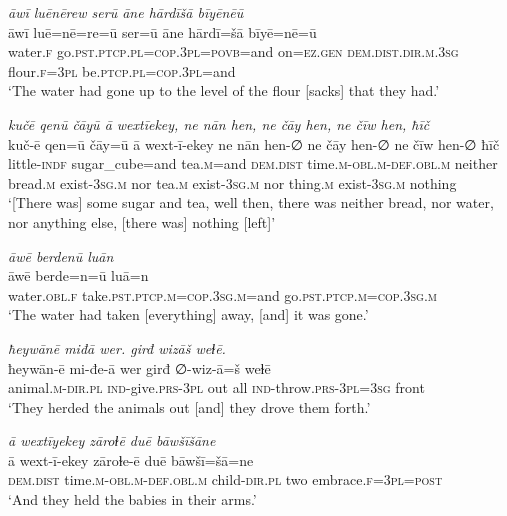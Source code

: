 \ea \label{ZB.28}
\textit{āwī luēnērew serū āne hārdīšā bīyēnēū} \\ 
\gll āwī luē=nē=re=ū ser=ū āne hārdī=šā bīyē=nē=ū \\ 
 water\textsc{.f} go\textsc{.pst}\textsc{.ptcp}\textsc{.pl}\textsc{=cop}\textsc{.3pl}\textsc{=\textsc{povb}}=and on\textsc{\textsc{=ez.gen}} \textsc{dem.dist}\textsc{.dir}\textsc{.m}\textsc{.3sg} flour\textsc{.f}\textsc{=3pl} be\textsc{.ptcp}\textsc{.pl}\textsc{=cop}\textsc{.3pl}=and \\ 
\glt `The water had gone up to the level of the flour [sacks] that they had.'
\z 
 
\ea \label{ZB.29}
\textit{kučē qenū čāyū ā wextīekey, ne nān hen, ne čāy hen, ne čīw hen, ħīč} \\ 
\gll kuč-ē qen=ū čāy=ū ā wext-ī-ekey ne nān hen-∅ ne čāy hen-∅ ne čīw hen-∅ ħīč \\ 
 little\textsc{-indf} sugar\_cube=and tea\textsc{.m}=and \textsc{dem.dist} time\textsc{.m}\textsc{-obl}\textsc{.m}\textsc{-def}\textsc{.obl}\textsc{.m} neither bread\textsc{.m} exist\textsc{-3sg}\textsc{.m} nor tea\textsc{.m} exist\textsc{-3sg}\textsc{.m} nor thing\textsc{.m} exist\textsc{-3sg}\textsc{.m} nothing \\ 
\glt `[There was] some sugar and tea, well then, there was neither bread, nor water, nor anything else, [there was] nothing [left]'
\z 
 
\ea \label{ZB.30}
\textit{āwē berdenū luān} \\ 
\gll āwē berde=n=ū luā=n \\ 
 water\textsc{.obl}\textsc{.f} take\textsc{.pst}\textsc{.ptcp}\textsc{.m}\textsc{=cop}\textsc{.3sg}\textsc{.m}=and go\textsc{.pst}\textsc{.ptcp}\textsc{.m}\textsc{=cop}\textsc{.3sg}\textsc{.m} \\ 
\glt `The water had taken [everything] away, [and] it was gone.'
\z 
 
\ea \label{ZB.31}
\textit{ħeywānē miđā wer. girđ wizāš weɫē.} \\ 
\gll ħeywān-ē mi-đe-ā wer girđ ∅-wiz-ā=š weɫē \\ 
 animal\textsc{.m}\textsc{-dir}\textsc{.pl} \textsc{ind-}give\textsc{.prs}\textsc{-3pl} out all \textsc{ind-}throw\textsc{.prs}\textsc{-3pl}\textsc{=3sg} front \\ 
\glt `They herded the animals out [and] they drove them forth.'
\z 
 
\ea \label{ZB.32}
\textit{ā wextīyekey zāroɫē duē bāwšīšāne} \\ 
\gll ā wext-ī-ekey zāroɫe-ē duē bāwšī=šā=ne \\ 
 \textsc{dem.dist} time\textsc{.m}\textsc{-obl}\textsc{.m}\textsc{-def}\textsc{.obl}\textsc{.m} child\textsc{-dir}\textsc{.pl} two embrace\textsc{.f}\textsc{=3pl}\textsc{=\textsc{post}} \\ 
\glt `And they held the babies in their arms.'
\z 
 
